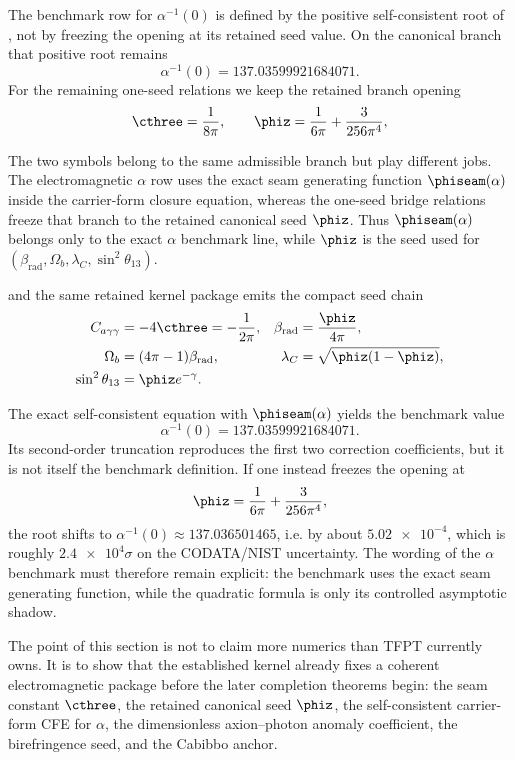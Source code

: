 The benchmark row for $\alpha^{-1}(0)$ is defined by the positive self-consistent root of , not by freezing the opening at its retained seed value. On the canonical branch that positive root remains
\[
\alpha^{-1}(0)=\num{137.03599921684071}.
\]
For the remaining one-seed relations we keep the retained branch opening
\begin{equation}
\label{eq:hard-kernel-values}
\cthree=\frac{1}{8\pi},
\qquad
\phiz=\frac{1}{6\pi}+\frac{3}{256\pi^4},
\end{equation}
\begin{remark}
The two symbols belong to the same admissible branch but play different jobs. The electromagnetic $\alpha$ row uses the exact seam generating function $\phiseam(\alpha)$ inside the carrier-form closure equation, whereas the one-seed bridge relations freeze that branch to the retained canonical seed $\phiz$. Thus $\phiseam(\alpha)$ belongs only to the exact $\alpha$ benchmark line, while $\phiz$ is the seed used for $(\beta_{\mathrm{rad}},\Omega_b,\lambda_C,\sin^2\theta_{13})$.
\end{remark}
and the same retained kernel package emits the compact seed chain
\begin{equation}
\label{eq:kernel-benchmark-formulas}
\begin{aligned}
C_{a\gamma\gamma}&=-4\cthree=-\frac{1}{2\pi},
&
\beta_{\mathrm{rad}}&=\frac{\phiz}{4\pi},
\\
\Omega_b&=(4\pi-1)\beta_{\mathrm{rad}},
&
\lambda_C&=\sqrt{\phiz(1-\phiz)},
\\
\sin^2\theta_{13}&=\phiz e^{-\gamma}.
\end{aligned}
\end{equation}
\begin{remark}
The exact self-consistent equation with $\phiseam(\alpha)$ yields the benchmark value
\[
\alpha^{-1}(0)=\num{137.03599921684071}.
\]
Its second-order truncation reproduces the first two correction coefficients, but it is not itself the benchmark definition. If one instead freezes the opening at
\[
\phiz=\frac{1}{6\pi}+\frac{3}{256\pi^4},
\]
the root shifts to $\alpha^{-1}(0)\approx \num{137.036501465}$, i.e. by about $\num{5.02e-4}$, which is roughly $\num{2.4e4}\sigma$ on the CODATA/NIST uncertainty. The wording of the $\alpha$ benchmark must therefore remain explicit: the benchmark uses the exact seam generating function, while the quadratic formula is only its controlled asymptotic shadow.
\end{remark}
\begin{tcolorbox}[colback=tfptblue!3, colframe=tfptblue, breakable,
    title={Kernel-output package}, colbacktitle=tfptblue]
The point of this section is not to claim more numerics than TFPT currently owns. It is to show that the established kernel already fixes a coherent electromagnetic package before the later completion theorems begin: the seam constant $\cthree$, the retained canonical seed $\phiz$, the self-consistent carrier-form CFE for $\alpha$, the dimensionless axion--photon anomaly coefficient, the birefringence seed, and the Cabibbo anchor.
\end{tcolorbox}


